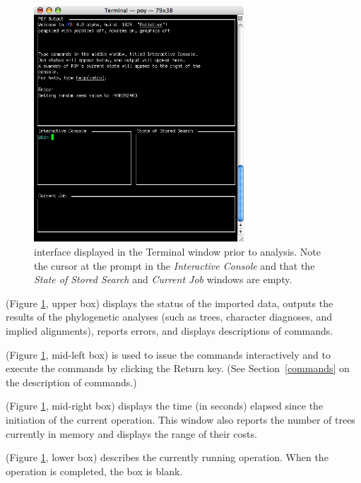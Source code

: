 {\begin{figure}[htbp]
   \centering
   \includegraphics[width=0.7\textwidth]{doc/figures/figinterface.jpg}
   \caption{\poy interface displayed in the Terminal window prior to analysis. Note the cursor at the \poy prompt in the \emph{Interactive Console} and that the \emph{State of Stored Search} and \emph{Current Job} windows are empty.}
   \label{fig:figinterface}
\end{figure}

\begin{description}
\setlength{\labelsep}{5pt}
\setlength{\itemindent}{0pt}%
\item[POY Output] (Figure \ref{fig:figinterface}, upper box) displays the status of the imported data, outputs the results of the phylogenetic analyses (such as trees, character diagnoses, and implied alignments), reports errors, and displays descriptions of \poy commands.
\item[Interactive Console] (Figure \ref{fig:figinterface}, mid-left box) is used to issue the commands interactively and to execute the commands by clicking the Return key. (See Section~\ref{commands} on the description of \poy commands.)
\item[State of Stored Search] (Figure \ref{fig:figinterface}, mid-right box) displays the time (in seconds) elapsed since the initiation of the current operation. This window also reports the number of trees currently in memory and displays the range of their costs.
\item[Current Job] (Figure \ref{fig:figinterface}, lower box) describes the currently running operation. When the operation is completed, the box is blank.
\end{description} 

}
